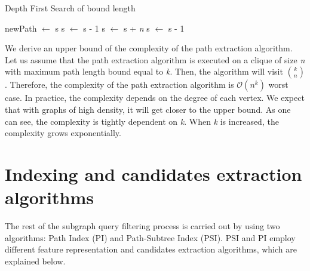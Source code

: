 \documentclass{l4proj}
\begin{document}
\begin{algorithm}
\centering
\caption{Depth First Search of bound length}
\label{alg:dfsBounded}
\begin{algorithmic}[1]
\State newPath  $\gets$ s  
\State {}
\EndIf
{}
\State s $\gets$ s - 1 
\EndIf
{}
\State s $\gets$ s + \emph{n}
\State {} 
\EndIf
\EndFor
{} 
\State  s $\gets$ s - 1
\EndIf
\EndProcedure
\end{algorithmic}
\end{algorithm}

We derive an upper bound of the complexity of the path extraction algorithm. Let us assume that the path extraction algorithm is executed on a clique of size \emph{n} with maximum path length bound equal to \emph{k}. Then, the algorithm will visit $\binom {k} {n}$. Therefore, the complexity of the path extraction algorithm is $\mathcal{O}(n^{k})$ worst case. In practice, the complexity depends on the degree of each vertex. We expect that with graphs of high density, it will get closer to the upper bound. As one can see, the complexity is tightly dependent on \emph{k}. When \emph{k} is increased, the complexity grows exponentially.
 
\section{Indexing and candidates extraction algorithms}
\label{sec:PIandPSI}
The rest of the subgraph query filtering process is carried out by using two algorithms: Path Index (PI) and Path-Subtree Index (PSI). PSI and PI employ different feature representation and candidates extraction algorithms, which are explained below.
\end{document}
